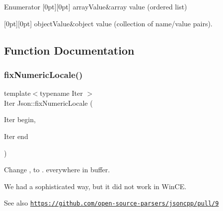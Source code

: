 \begin{DoxyEnumFields}{Enumerator}
[0pt][0pt]{}\mbox{\label{namespaceJson_a7d654b75c16a57007925868e38212b4eadc8f264f36b55b063c78126b335415f4}} 
array\+Value&array value (ordered list) \\
\hline

[0pt][0pt]{}\mbox{\label{namespaceJson_a7d654b75c16a57007925868e38212b4eae8386dcfc36d1ae897745f7b4f77a1f6}} 
object\+Value&object value (collection of name/value pairs). \\
\hline

\end{DoxyEnumFields}


\subsection{Function Documentation}
\mbox{\label{namespaceJson_a4f93f184c2890cb99b07afeed10a89ec}} 
\subsubsection{\texorpdfstring{fix\+Numeric\+Locale()}{fixNumericLocale()}}
{\footnotesize\ttfamily template$<$typename Iter $>$ \\
Iter Json\+::fix\+Numeric\+Locale (\begin{DoxyParamCaption}\item[{Iter}]{begin,  }\item[{Iter}]{end }\end{DoxyParamCaption})}

Change \textquotesingle{},\textquotesingle{} to \textquotesingle{}.\textquotesingle{} everywhere in buffer.

We had a sophisticated way, but it did not work in Win\+CE. \begin{DoxySeeAlso}{See also}
\href{https://github.com/open-source-parsers/jsoncpp/pull/9}{\tt https\+://github.\+com/open-\/source-\/parsers/jsoncpp/pull/9} 
\end{DoxySeeAlso}
\mbox{\label{namespaceJson_ae7b26e19e40cb18a11568cb477ff1743}} 
